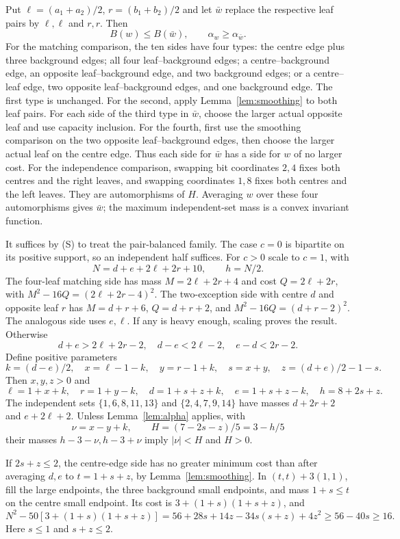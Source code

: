 \documentclass[11pt]{article}
\begin{document}
Put $\ell=(a_1+a_2)/2$, $r=(b_1+b_2)/2$ and let $\bar w$ replace
the respective leaf pairs by $\ell,\ell$ and $r,r$.
Then
\[
 B(w)\leq B(\bar w),\qquad \alpha_w\geq\alpha_{\bar w}. \tag{S}
\]
For the matching comparison, the ten sides have four types:
the centre edge plus three background edges; all four leaf--background
edges; a centre--background edge, an opposite leaf--background edge,
and two background edges; or a centre--leaf edge, two opposite
leaf--background edges, and one background edge.
The first type is unchanged. For the second, apply
Lemma~\ref{lem:smoothing} to both leaf pairs.
For each side of the third type in $\bar w$, choose the larger actual
opposite leaf and use capacity inclusion.
For the fourth, first use the smoothing comparison on the two opposite
leaf--background edges, then choose the larger actual leaf on the centre
edge. Thus each side for $\bar w$ has a side for $w$ of no larger cost.
For the independence comparison, swapping bit coordinates $2,4$ fixes
both centres and the right leaves, and swapping coordinates $1,8$ fixes
both centres and the left leaves. They are automorphisms of $H$.
Averaging $w$ over these four automorphisms gives $\bar w$;
the maximum independent-set mass is a convex invariant function.

It suffices by (S) to treat the pair-balanced family.
The case $c=0$ is bipartite on its positive support, so an independent
half suffices. For $c>0$ scale to $c=1$, with
\[
 N=d+e+2\ell+2r+10,\qquad h=N/2 .
\]
The four-leaf matching side has mass $M=2\ell+2r+4$ and cost
$Q=2\ell+2r$, with $M^2-16Q=(2\ell+2r-4)^2$.
The two-exception side with centre $d$ and opposite leaf $r$ has
$M=d+r+6$, $Q=d+r+2$, and $M^2-16Q=(d+r-2)^2$.
The analogous side uses $e,\ell$.
If any is heavy enough, scaling proves the result.
Otherwise
\[
 d+e>2\ell+2r-2,\quad d-e<2\ell-2,\quad e-d<2r-2.
\]
Define positive parameters
\[
 k=(d-e)/2,\quad x=\ell-1-k,\quad y=r-1+k,\quad
 s=x+y,\quad z=(d+e)/2-1-s .
\]
Then $x,y,z>0$ and
\[
 \ell=1+x+k,\quad r=1+y-k,\quad
 d=1+s+z+k,\quad e=1+s+z-k,\quad h=8+2s+z.
\]
The independent sets $\{1,6,8,11,13\}$ and $\{2,4,7,9,14\}$
have masses $d+2r+2$ and $e+2\ell+2$.
Unless Lemma~\ref{lem:alpha} applies, with
\[
 \nu=x-y+k,\qquad H=(7-2s-z)/5=3-h/5
\]
their masses $h-3-\nu,h-3+\nu$ imply $|\nu|<H$ and $H>0$.

If $2s+z\leq2$, the centre-edge side has no greater minimum cost
than after averaging $d,e$ to $t=1+s+z$, by
Lemma~\ref{lem:smoothing}.
In $(t,t)+3(1,1)$, fill the large endpoints, the three background
small endpoints, and mass $1+s\leq t$ on the centre small endpoint.
Its cost is $3+(1+s)(1+s+z)$, and
\[
 N^2-50[3+(1+s)(1+s+z)]
 =56+28s+14z-34s(s+z)+4z^2
 \geq56-40s\geq16 .
\]
Here $s\leq1$ and $s+z\leq2$.
\end{document}
